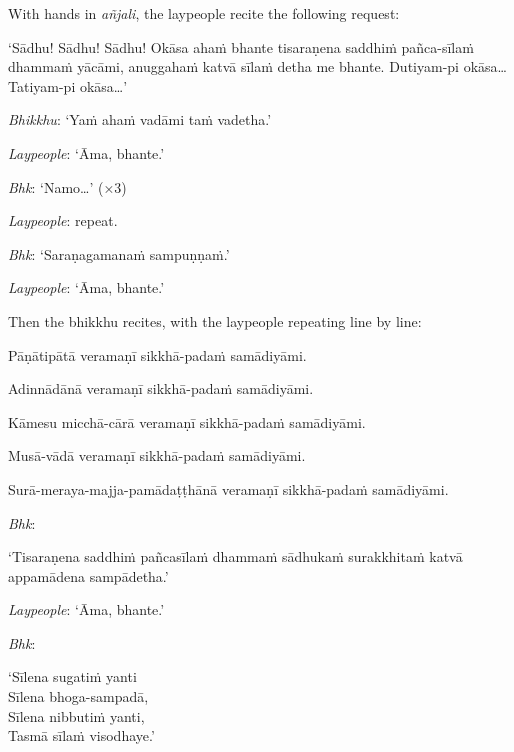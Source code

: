 With hands in \emph{añjali}, the laypeople recite the following request:

‘Sādhu! Sādhu! Sādhu! Okāsa ahaṁ bhante tisaraṇena saddhiṁ pañca-sīlaṁ dhammaṁ
yācāmi, anuggahaṁ katvā sīlaṁ detha me bhante. Dutiyam-pi okāsa… Tatiyam-pi
okāsa…’

\emph{Bhikkhu}: ‘Yaṁ ahaṁ vadāmi taṁ vadetha.’

\emph{Laypeople}: ‘Āma, bhante.’

\emph{Bhk}: ‘Namo…’ (×3)

\emph{Laypeople}: repeat.

\emph{Bhk}: ‘Saraṇagamanaṁ sampuṇṇaṁ.’

\emph{Laypeople}: ‘Āma, bhante.’

Then the bhikkhu recites, with the laypeople repeating line by line:

\begin{packeditemize}

\item Pāṇātipātā veramaṇī sikkhā-padaṁ samādiyāmi.
\item Adinnādānā veramaṇī sikkhā-padaṁ samādiyāmi.
\item Kāmesu micchā-cārā veramaṇī sikkhā-padaṁ samādiyāmi.
\item Musā-vādā veramaṇī sikkhā-padaṁ samādiyāmi.
\item Surā-meraya-majja-pamādaṭṭhānā veramaṇī sikkhā-padaṁ samādiyāmi.

\end{packeditemize}


\emph{Bhk}:

‘Tisaraṇena saddhiṁ pañcasīlaṁ dhammaṁ sādhukaṁ surakkhitaṁ katvā appamādena
sampādetha.’

\emph{Laypeople}: ‘Āma, bhante.’

\emph{Bhk}:

‘Sīlena sugatiṁ yanti\\
Sīlena bhoga-sampadā,\\
Sīlena nibbutiṁ yanti,\\
Tasmā sīlaṁ visodhaye.’

